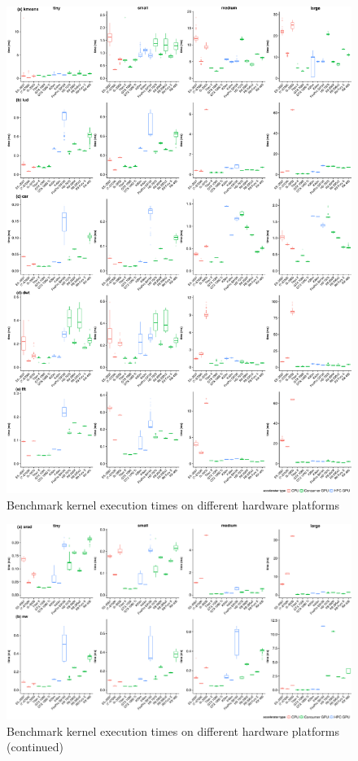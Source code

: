 \documentclass[../document.tex]{subfiles}
\begin{document}
\begin{figure}
    \centering
    \includegraphics[width=.9\textwidth,keepaspectratio]{figures/new-time-results/generate_main_4x5_bandwplot}
    \caption{Benchmark kernel execution times on different hardware platforms}
    \label{fig:time}
\end{figure}

\begin{figure}[t]
    \centering
    \includegraphics[width=\textwidth,keepaspectratio]{figures/new-time-results/generate_main_4x2_bandwplot}
    \caption{Benchmark kernel execution times on different hardware platforms (continued)}
    \label{fig:time2}
\end{figure}
\end{document}
